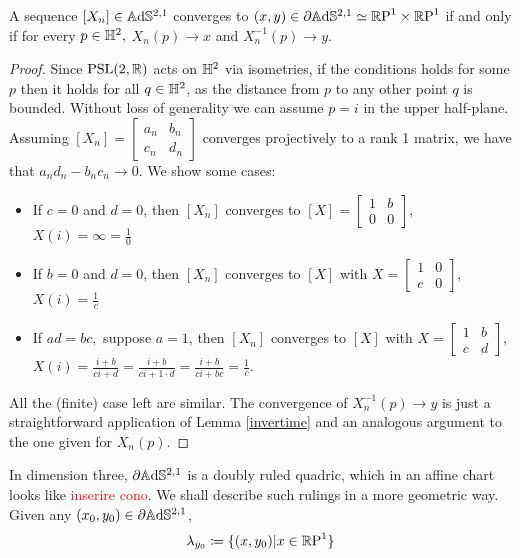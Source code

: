 \begin{lemma}\label{convergenza}
    A sequence $[X_n]\in\mathbb{A}\mathrm{d}\mathbb{S}^{2,1}$ converges to $(x,y)\in\partial\mathbb{A}\mathrm{d}\mathbb{S}^{2,1}\simeq\mathbb{R}\text{P}^1\times\mathbb{R}\text{P}^1$ if and only if for every $p\in\mathbb{H}^2,$ $X_n(p)\to x$ and $X_n^{-1}(p)\to y.$ 
\end{lemma}
\begin{proof}
    Since $\text{PSL}(2,\mathbb{R})$ acts on $\mathbb{H}^2$ via isometries, if the conditions holds for some $p$ then it holds for all $q\in\mathbb{H}^2$, as the distance from $p$ to any other point $q$ is bounded. Without loss of generality we can assume $p=i$ in the upper half-plane. Assuming $[X_n]=\begin{bmatrix}
        a_n & b_n \\
        c_n & d_n
    \end{bmatrix}$ converges projectively to a rank 1 matrix, we have that $a_nd_n-b_nc_n\rightarrow0$. We show some cases:
    \begin{itemize}
        \item If $c=0$ and $d=0$, then $[X_n]$ converges to $[X]=\begin{bmatrix}
            1 & b \\
            0 & 0\end{bmatrix}$, $X(i)=\infty=\frac{1}{0}$

        \item If $b=0$ and $d=0$, then $[X_n]$ converges to $[X]$ with $X=\begin{bmatrix}
            1 & 0 \\
            c & 0 \end{bmatrix}$, $X(i)=\frac{1}{c}$
        \item If $ad=bc,$ suppose $a=1$, then $[X_n]$ converges to $[X]$ with $X=\begin{bmatrix}
            1 & b \\
            c & d \end{bmatrix}$, $X(i)=\frac{i+b}{ci+d}=\frac{i+b}{ci+1\cdot d}=\frac{i+b}{ci+bc}=\frac{1}{c}$.
    \end{itemize}
    All the (finite) case left are similar.
    The convergence of $X_n^{-1}(p)\to y$ is just a straightforward application of Lemma \ref{invertime} and an analogous argument to the one given for $X_n(p)$.
\end{proof}

In dimension three, $\partial\mathbb{A}\mathrm{d}\mathbb{S}^{2,1}$ is a doubly ruled quadric, which in an affine chart looks like \textcolor{red}{inserire cono}. We shall describe such rulings in a more geometric way. Given any $(x_0,y_0)\in\partial\mathbb{A}\mathrm{d}\mathbb{S}^{2,1}$, 
\begin{equation}\label{ruling}
        \lambda_{y_0}\coloneqq\{(x,y_0)|x\in\mathbb{R}\text{P}^1\}
\end{equation}

